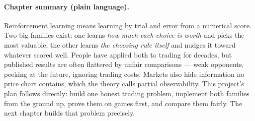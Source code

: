 \paragraph{Chapter summary (plain language).} Reinforcement learning
means learning by trial and error from a numerical score. Two big
families exist: one learns \emph{how much each choice is worth} and picks
the most valuable; the other learns \emph{the choosing rule itself} and
nudges it toward whatever scored well. People have applied both to
trading for decades, but published results are often flattered by unfair
comparisons --- weak opponents, peeking at the future, ignoring trading
costs. Markets also hide information no price chart contains, which the
theory calls partial observability. This project's plan follows directly:
build one honest trading problem, implement both families from the ground
up, prove them on games first, and compare them fairly. The next chapter
builds that problem precisely.
